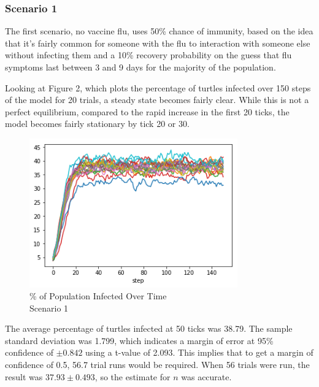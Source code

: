 \documentclass[11pt]{article} %
\begin{document}
\subsubsection{Scenario 1}

The first scenario, no vaccine flu, uses 50\% chance of immunity, based on the idea that it's fairly common for someone with the flu to interaction with someone else without infecting them and a 10\% recovery probability on the guess that flu symptoms last between 3 and 9 days for the majority of the population.


Looking at Figure 2, which plots the percentage of turtles infected over 150 steps of the model for 20 trials, a steady state becomes fairly clear. While this is not a perfect equilibrium, compared to the rapid increase in the first 20 ticks, the model becomes fairly stationary by tick 20 or 30.   

\begin{figure}
\centering
\includegraphics[width=0.8\textwidth]{scen_1_steady_state}
\caption{\% of Population Infected Over Time \\ Scenario 1}
\end{figure}



The average percentage of turtles infected at 50 ticks was 38.79. The sample standard deviation was 1.799, which indicates a margin of error at 95\% confidence of $\pm 0.842$ using a t-value of 2.093. This implies that to get a margin of confidence of 0.5, 56.7 trial runs would be required. When 56 trials were run, the result was $37.93 \pm 0.493$, so the estimate for $n$ was accurate. 
\end{document}
